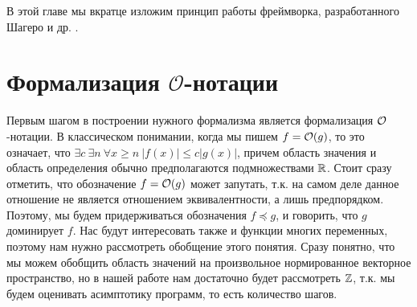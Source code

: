 В этой главе мы вкратце изложим принцип работы фреймворка, разработанного Шагеро и др. \cite{base_article}.
\section{Формализация $\mathcal{O}$-нотации}
Первым шагом в построении нужного формализма является формализация $\mathcal{O}$-нотации. В классическом понимании, когда мы пишем $f = \mathcal{O}(g)$, то это означает,
что $\exists c\ \exists n\ \forall x \geq n\  |f(x)| \leq c|g(x)|$, причем область значения и область определения обычно предполагаются подмножествами $\mathbb{R}$.
Стоит сразу отметить, что обозначение $f = \mathcal{O}(g)$ может запутать, т.к. на самом деле данное отношение не является отношением эквивалентности, а лишь
предпорядком. Поэтому, мы будем придерживаться обозначения $f \preccurlyeq g$, и говорить, что $g$ доминирует $f$.
Нас будут интересовать также и функции многих переменных, поэтому нам нужно рассмотреть обобщение этого понятия. Сразу понятно, что мы можем обобщить область
значений на произвольное нормированное векторное пространство, но в нашей работе нам достаточно будет рассмотреть $\mathbb{Z}$, т.к. мы будем оценивать асимптотику программ,
то есть количество шагов.
